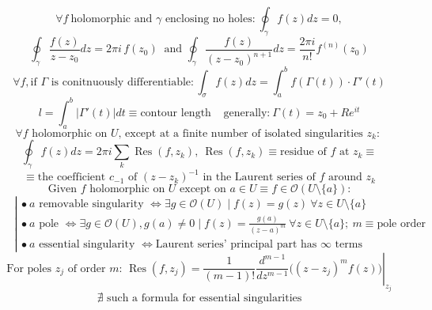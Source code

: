\[
\forall f  \ \text{holomorphic and $\gamma$ enclosing no holes:} \ \oint_\gamma f(z)dz = 0,
\]
\[
\oint_\gamma \frac{f(z)}{z-z_0}  dz = 2\pi  i \,f(z_0)\ \text{ and }
\oint_\gamma \frac{f(z)}{(z-z_0)^{n+1}} dz = \frac{2\pi i}{n!}f^{(n)}(z_0) 
\]
\[
\forall f, \text{if $\Gamma$ is conitnuously differentiable}: \int_\sigma f(z)dz = \int_a^b f(\Gamma(t))\cdot \Gamma'(t)
\]
\[
l= \int_a^b \left| \Gamma'(t)\right|dt\equiv \text{contour length} \;\; \;\; \text{generally:} \ \Gamma(t) = z_0 + Re^{it}
\]
 \[
 \text{$\forall f$ holomorphic on $U$, except at a finite number of isolated singularities $z_k$:
 }
 \]
 \[
 \oint_\gamma f(z)dz = 2\pi i \sum_{k} \operatorname{Res} (f,z_k), \ \operatorname{Res}(f,z_k)  \equiv \text{residue of $f$ at $z_k$}  \equiv 
 \]
 \[
 \equiv  \text{the coefficient $c_{-1}$ of $(z-z_k)^{-1}$ in the Laurent series of $f$ around $z_k$} 
 \]\vspace{-4pt}
\[
\text{Given $f$ holomorphic on $U$ except on $a \in U \equiv f \in \mathcal{O}(U\setminus \{ a\}) $:}
\]
$\hspace{15pt} \left |  \!\!\!
\begin{array}{l}
\bullet\ a\text{ removable singularity } \Leftrightarrow \exists g \in \mathcal{O}(U)\mid f(z) = g(z)\ \forall z \in U\setminus\{a\} \\
\bullet\ a\text{ pole } \Leftrightarrow \exists g \in \mathcal{O}(U), g(a) \neq 0 \mid f(z) = \frac{g(a)}{(z-a)^m}\ \forall z \in U\setminus\{a\};\ m \equiv \text{pole order} \\
\bullet\ a\text{ essential singularity } \Leftrightarrow \text{Laurent series' principal part has }\infty\text{ terms}
\end{array}
\right.$
\[
\text{For poles $z_j$ of order $m$: } \operatorname{Res}(f,z_j) =\left. \frac{1}{(m-1)!} \frac{d^{m-1}}{dz^{m-1}}\big((z-z_j)^m f(z)\big)\right|_{z_j}
\]
\[
\nexists \text{ such a formula for essential singularities}
\]